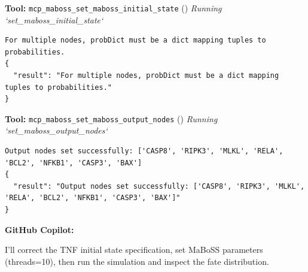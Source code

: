 \documentclass[11pt,a4paper]{article}
\begin{document}
\begin{toolokbox}
\textbf{Tool:} \texttt{mcp\_maboss\_set\_maboss\_initial\_state} (\checkmark)
\textit{Running `set\_maboss\_initial\_state`}
\begin{lstlisting}
For multiple nodes, probDict must be a dict mapping tuples to probabilities.
{
  "result": "For multiple nodes, probDict must be a dict mapping tuples to probabilities."
}
\end{lstlisting}
\end{toolokbox}
\begin{toolokbox}
\textbf{Tool:} \texttt{mcp\_maboss\_set\_maboss\_output\_nodes} (\checkmark)
\textit{Running `set\_maboss\_output\_nodes`}
\begin{lstlisting}
Output nodes set successfully: ['CASP8', 'RIPK3', 'MLKL', 'RELA', 'BCL2', 'NFKB1', 'CASP3', 'BAX']
{
  "result": "Output nodes set successfully: ['CASP8', 'RIPK3', 'MLKL', 'RELA', 'BCL2', 'NFKB1', 'CASP3', 'BAX']"
}
\end{lstlisting}
\end{toolokbox}
\begin{copilotbox}
\textbf{GitHub Copilot:}

I’ll correct the TNF initial state specification, set MaBoSS parameters (threads=10), then run the simulation and inspect the fate distribution.

\end{copilotbox}
\end{document}
